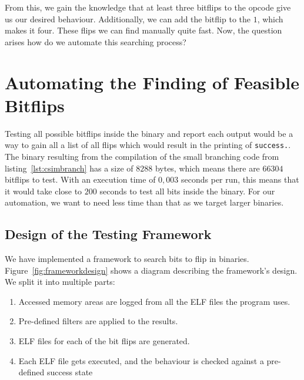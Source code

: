 From this, we gain the knowledge that at least three bitflips to the opcode give
us our desired behaviour. Additionally, we can add the bitflip to the $1$, which
makes it four. These flips we can find manually quite fast. Now, the question
arises how do we automate this searching process?

\section{Automating the Finding of Feasible Bitflips}

Testing all possible bitflips inside the binary and report each output would be
a way to gain all a list of all flips which would result in the printing of
\texttt{success.}. The binary resulting from the compilation of the small
branching code from listing~\ref{lst:csimbranch} has a size of $8288$ bytes,
which means there are $66304$ bitflips to test. With an execution time of
$0,003$ seconds per run, this means that it would take close to $200$ seconds to
test all bits inside the binary. For our automation, we want to need less time
than that as we target larger binaries.

\subsection{Design of the Testing Framework}

We have implemented a framework to search bits to flip in binaries.
Figure~\ref{fig:frameworkdesign} shows a diagram describing the framework's
design. We split it into multiple parts:

\begin{enumerate}
  \item Accessed memory areas are logged from all the ELF files the program
uses.
  \item Pre-defined filters are applied to the results.
  \item ELF files for each of the bit flips are generated.
  \item Each ELF file gets executed, and the behaviour is checked  against a
pre-defined success state
\end{enumerate}

